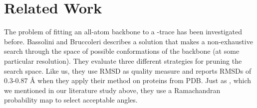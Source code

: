 \section{Related Work}
The problem of fitting an all-atom backbone to a \Ca-trace has been
investigated before. Bassolini and Bruccoleri
\cite{bassolino1992application} describes a solution that makes a
non-exhaustive search through the space of possible conformations of
the backbone (at some particular resolution). They evaluate three
different strategies for pruning the search space. Like us, they use
RMSD as quality measure and reports RMSDs of 0.3-0.87 Å when they
apply their method on proteins from PDB. Just as \cite{canutescu2003},
which we mentioned in our literature study above, they use a
Ramachandran probability map to select acceptable angles.



